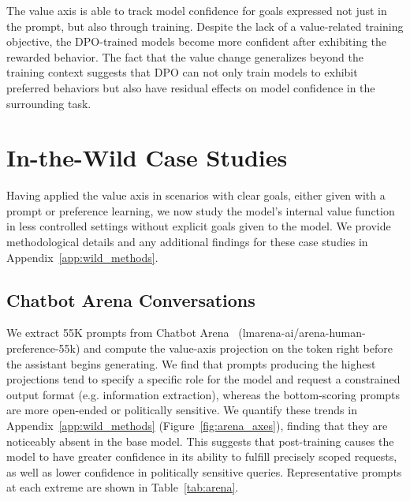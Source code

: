 \documentclass{article}
\begin{document}
The value axis is able to track model confidence for goals expressed not just in the prompt, but also through training. Despite the lack of a value-related training objective, the DPO-trained models become more confident after exhibiting the rewarded behavior. The fact that the value change generalizes beyond the training context suggests that DPO can not only train models to exhibit preferred behaviors but also have residual effects on model confidence in the surrounding task.

\section{In-the-Wild Case Studies}
\label{sec:wild}

Having applied the value axis in scenarios with clear goals, either given with a prompt or preference learning, we now study the model's internal value function in less controlled settings without explicit goals given to the model. We provide methodological details and any additional findings for these case studies in Appendix~\ref{app:wild_methods}.

\subsection{Chatbot Arena Conversations}
\label{sec:arena}

We extract 55K prompts from Chatbot Arena~\citep{chiang2024chatbot} (lmarena-ai/arena-human-preference-55k) and compute the value-axis projection on the token right before the assistant begins generating. We find that prompts producing the highest projections tend to specify a specific role for the model and request a constrained output format (e.g. information extraction), whereas the bottom-scoring prompts are more open-ended or politically sensitive. We quantify these trends in Appendix~\ref{app:wild_methods} (Figure~\ref{fig:arena_axes}), finding that they are noticeably absent in the base model. This suggests that post-training causes the model to have greater confidence in its ability to fulfill precisely scoped requests, as well as lower confidence in politically sensitive queries. Representative prompts at each extreme are shown in Table~\ref{tab:arena}.
\end{document}
